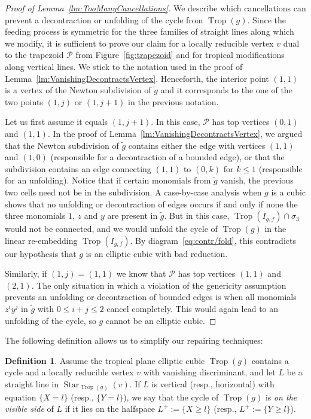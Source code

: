 \documentclass[11pt]{amsart}
\numberwithin{equation}{section}
\theoremstyle{plain}
\theoremstyle{definition}
\newtheorem{definition}[theorem]{Definition}
\theoremstyle{remark}
\begin{document}
 \begin{proof}[Proof of Lemma~\ref{lm:TooManyCancellations}]
   We describe which cancellations can prevent a decontraction or
   unfolding of the cycle from $\operatorname{Trop}(g)$. Since the feeding process
   is symmetric for the three families of straight lines along which we
   modify, it is sufficient to prove our claim for a locally reducible
   vertex $v$ dual to the trapezoid ${\mathcal{P}}$ from
   Figure~\ref{fig:trapezoid} and for tropical modifications along
   vertical lines.  We stick to the notation used in the proof of
   Lemma~\ref{lm:VanishingDecontractsVertex}. Henceforth, the interior
   point $(1,1)$ is a vertex of the Newton subdivision of $\tilde{g}$
   and it corresponds to the one of the two points $(1,j)$ or
   $(1,j+1)$ in the previous notation.

   Let us first assume it equals $(1,j+1)$. In this case, ${\mathcal{P}}$ has
   top vertices $(0,1)$ and $(1,1)$. In the proof of
   Lemma~\ref{lm:VanishingDecontractsVertex}, we argued that the
   Newton subdivision of $\tilde{g}$ contains either the edge with
   vertices $(1,1)$ and $(1,0)$ (responsible for a decontraction of a
   bounded edge), or that the subdivision contains an edge connecting
   $(1,1)$ to $(0,k)$ for $k\leq 1$ (responsible for an
   unfolding). Notice that if certain monomials from $\tilde{g}$
   vanish, the previous two cells need not be in the subdivision.  A
   case-by-case analysis when $g$ is a cubic shows that no unfolding
   or decontraction of edges occurs if and only if none the three
   monomials $1$, $z$ and $y$ are present in $\tilde{g}$. But in this
   case, $\operatorname{Trop}(I_{g,f})\cap \sigma_3$ would not be connected, and we
   would unfold the cycle of $\operatorname{Trop}(g)$ in the linear re-embedding
   $\operatorname{Trop}(I_{g,f})$. By diagram~\eqref{eq:contr/fold}, this
   contradicts our hypothesis that $g$ is an elliptic cubic with bad
   reduction.

   Similarly, if $(1,j)=(1,1)$ we know that ${\mathcal{P}}$ has top vertices
   $(1,1)$ and $(2,1)$. The only situation in which a violation of the
   genericity assumption prevents an unfolding or decontraction of
   bounded edges is when all monomials $z^iy^j$ in $\tilde{g}$ with
   $0\leq i+j\leq 2$ cancel completely. This would again lead to an
   unfolding of the cycle, so $g$ cannot be an elliptic cubic.
\end{proof}
\smallskip The following definition allows us to simplify our
repairing techniques:
\begin{definition}\label{def:visibleSide}
  Assume the tropical plane elliptic cubic $\operatorname{Trop}(g)$ contains a cycle
  and a locally reducible vertex $v$ with vanishing discriminant, and
  let $L$ be a straight line in $\operatorname{\ensuremath{Star}}_{\operatorname{Trop}(g)}(v)$. If $L$ is
  vertical (resp., horizontal) with equation $\{X=l\}$ (resp., $\{Y=l\}$), we say that
  the cycle of $\operatorname{Trop}(g)$ is \emph{on the visible side} of $L$ if it
  lies on the halfspace $L^+:=\{X\geq l\}$ (resp., $L^+:=\{Y\geq l\}$).
\end{definition}
\end{document}
